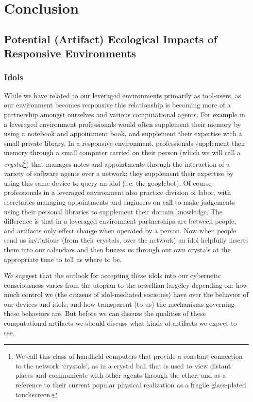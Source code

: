 \chapter{Conclusion}
\label{ch:conclusion}
%

\section{Potential (Artifact) Ecological Impacts of Responsive Environments}
\label{sec:ecological_impacts}
%
\subsection{Idols}
%
While we have related to our leveraged environments primarily as tool-users, as our environment becomes responsive this relationship is becoming more of a partnership amongst ourselves and various computational agents. 
For example in a leveraged environment professionals would often supplement their memory by using a notebook and appointment book, and supplement their expertise with a small private library. 
In a responsive environment, professionals supplement their memory through a small computer carried on their person (which we will call a \emph{crystal}\footnote{We call this class of handheld computers that provide a constant connection to the network `crystals', as in a crystal ball that is used to view distant places and communicate with other agents through the ether, and as a reference to their current popular physical realization as a fragile glass-plated touchscreen.}) that manages notes and appointments through the interaction of a variety of software agents over a network; they supplement their expertise by using this same device to query an idol (i.e. the googlebot).
Of course professionals in a leveraged environment also practice division of labor, with secretaries managing appointments and engineers on call to make judgements using their personal libraries to supplement their domain knowledge.
The difference is that in a leveraged environment partnerships are between people, and artifacts only effect change when operated by a person.
Now when people send us invitations (from their crystals, over the network) an idol helpfully inserts them into our calendars and then buzzes us through our own crystals at the appropriate time to tell us where to be.

We suggest that the outlook for accepting these idols into our cybernetic consciousness varies from the utopian to the orwellian largeley depending on: how much control we (the citizens of idol-mediated societies) have over the behavior of our devices and idols; and how transparent (to us) the mechanisms governing these behaviors are. But before we can discuss the qualities of these computational artifacts we should discuss what kinds of artifacts we expect to see.

